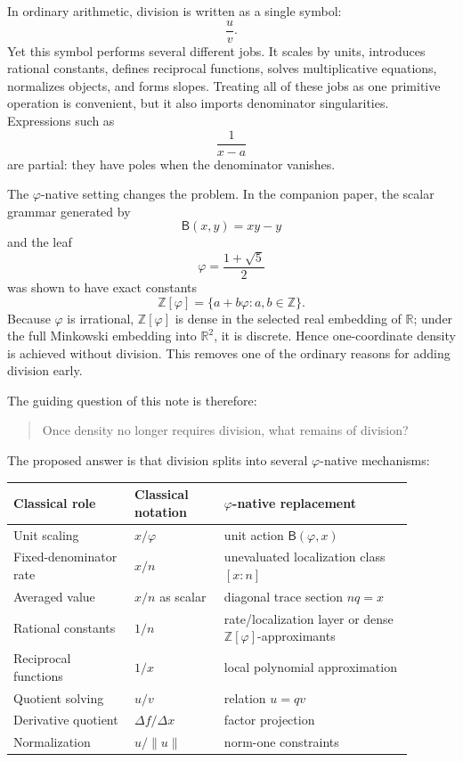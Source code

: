 \documentclass[11pt]{article}
\newcommand{\B}{\mathsf{B}}
\newcommand{\ph}{\varphi}
\newcommand{\Z}{\mathbb{Z}}
\newcommand{\R}{\mathbb{R}}
\begin{document}
In ordinary arithmetic, division is written as a single symbol:
\[
    \frac{u}{v}.
\]
Yet this symbol performs several different jobs.  It scales by units, introduces rational constants, defines reciprocal functions, solves multiplicative equations, normalizes objects, and forms slopes.  Treating all of these jobs as one primitive operation is convenient, but it also imports denominator singularities.  Expressions such as
\[
    \frac{1}{x-a}
\]
are partial: they have poles when the denominator vanishes.

The $\ph$-native setting changes the problem.  In the companion paper, the scalar grammar generated by
\[
    \B(x,y)=xy-y
\]
and the leaf
\[
    \ph=\frac{1+\sqrt5}{2}
\]
was shown to have exact constants
\[
    \Z[\ph]=\{a+b\ph:a,b\in\Z\}.
\]
Because $\ph$ is irrational, $\Z[\ph]$ is dense in the selected real embedding of $\R$; under the full Minkowski embedding into $\R^2$, it is discrete.  Hence one-coordinate density is achieved without division.  This removes one of the ordinary reasons for adding division early.

The guiding question of this note is therefore:
\begin{quote}
Once density no longer requires division, what remains of division?
\end{quote}

The proposed answer is that division splits into several $\ph$-native mechanisms:
\begin{center}
\begin{tabular}{p{0.27\linewidth}p{0.20\linewidth}p{0.42\linewidth}}
\toprule
Classical role & Classical notation & $\ph$-native replacement \\
\midrule
Unit scaling & $x/\ph$ & unit action $\B(\ph,x)$ \\
Fixed-denominator rate & $x/n$ & unevaluated localization class $[x:n]$ \\
Averaged value & $x/n$ as scalar & diagonal trace section $nq=x$ \\
Rational constants & $1/n$ & rate/localization layer or dense $\Z[\ph]$-approximants \\
Reciprocal functions & $1/x$ & local polynomial approximation \\
Quotient solving & $u/v$ & relation $u=qv$ \\
Derivative quotient & $\Delta f/\Delta x$ & factor projection \\
Normalization & $u/\|u\|$ & norm-one constraints \\
\bottomrule
\end{tabular}
\end{center}
\end{document}
